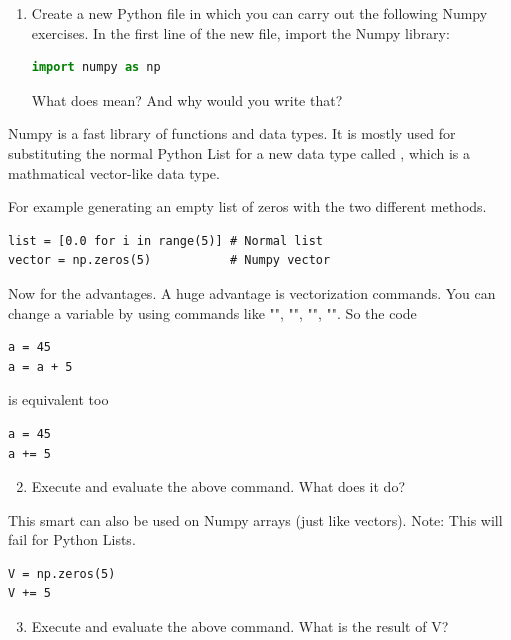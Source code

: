 \documentclass{article}
\begin{document}
\begin{enumerate}

    \item Create a new Python file in which you can carry out the following
        Numpy exercises. In the first line of the new file, import the Numpy
        library:

\begin{lstlisting}[language=python]
import numpy as np
\end{lstlisting}

        What does  mean? And why would you write that?

\end{enumerate}

Numpy is a fast library of functions and data types.
It is mostly used for substituting the normal Python List for a new data type
called , which is a mathmatical vector-like data type.

For example generating an empty list of zeros with the two different methods.

\begin{lstlisting}
list = [0.0 for i in range(5)] # Normal list
vector = np.zeros(5)           # Numpy vector
\end{lstlisting}

Now for the advantages.
A huge advantage is vectorization commands.
You can change a variable by using commands like
"\code{+=}",
"\code{-=}",
"\code{*=}",
"\code{/=}". So the code

\begin{lstlisting}
a = 45
a = a + 5
\end{lstlisting}

is equivalent too

\begin{lstlisting}
a = 45
a += 5
\end{lstlisting}

\begin{enumerate}
    \setcounter{enumi}{1}
    \item Execute and evaluate the above command. What does it do?
\end{enumerate}

This smart can also be used on Numpy arrays (just like vectors).
Note: This will fail for Python Lists.

\begin{lstlisting}
V = np.zeros(5)
V += 5
\end{lstlisting}

\begin{enumerate}
    \setcounter{enumi}{2}
    \item Execute and evaluate the above command. What is the result of V?
\end{enumerate}
\end{document}
